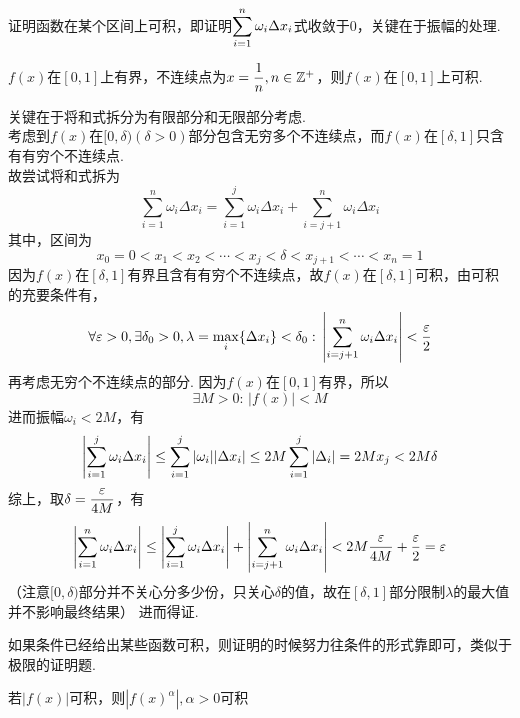 \par 证明函数在某个区间上可积，即证明$\displaystyle\sum_{i=1}^n\omega_i\Delta x_i$式收敛于$0$，关键在于振幅的处理.
\begin{example}
$f(x)$在$[0,1]$上有界，不连续点为$x=\dfrac{1}{n},n\in\mathbb{Z}^+$，则$f(x)$在$[0,1]$上可积.
\end{example}
\begin{analysis}
关键在于将和式拆分为有限部分和无限部分考虑.\\
考虑到$f(x)$在$[0,\delta)(\delta>0)$部分包含无穷多个不连续点，而$f(x)$在$[\delta,1]$只含有有穷个不连续点.\\
故尝试将和式拆为
\[\sum_{i=1}^n\omega_i\Delta x_i=\sum_{i=1}^j\omega_i\Delta x_i+\sum_{i=j+1}^n\omega_i\Delta x_i\]
其中，区间为
\[x_0=0<x_1<x_2<\cdots<x_j<\delta<x_{j+1}<\cdots<x_n=1\]
因为$f(x)$在$[\delta,1]$有界且含有有穷个不连续点，故$f(x)$在$[\delta,1]$可积，由可积的充要条件有，
\[\forall\varepsilon>0,\exists\delta_0>0,\lambda=\max_i\{\Delta x_i\}<\delta_0:\,\left|\sum_{i=j+1}^n\omega_i\Delta x_i\right|<\dfrac{\varepsilon}{2}\]
再考虑无穷个不连续点的部分. 因为$f(x)$在$[0,1]$有界，所以
\[\exists M>0:\,|f(x)|<M\]
进而振幅$\omega_i<2M$，有
\[\left|\sum_{i=1}^j\omega_i\Delta x_i\right|\leq\sum_{i=1}^j|\omega_i||\Delta x_i|\leq 2M\sum_{i=1}^j|\Delta_i|=2Mx_j<2M\delta\]
综上，取$\delta=\dfrac{\varepsilon}{4M}$，有
\[\left|\sum_{i=1}^n\omega_i\Delta x_i\right|\leq\left|\sum_{i=1}^j\omega_i\Delta x_i\right|+\left|\sum_{i=j+1}^n\omega_i\Delta x_i\right|<2M\dfrac{\varepsilon}{4M}+\dfrac{\varepsilon}{2}=\varepsilon\]
（注意$[0,\delta)$部分并不关心分多少份，只关心$\delta$的值，故在$[\delta,1]$部分限制$\lambda$的最大值并不影响最终结果）
进而得证.
\end{analysis}
\par 如果条件已经给出某些函数可积，则证明的时候努力往条件的形式靠即可，类似于极限的证明题.
\begin{example}
\label{ex:f_f2_absf_relation_lemma}
若$|f(x)|$可积，则$|f(x)^\alpha|,\alpha>0$可积
\end{example}
